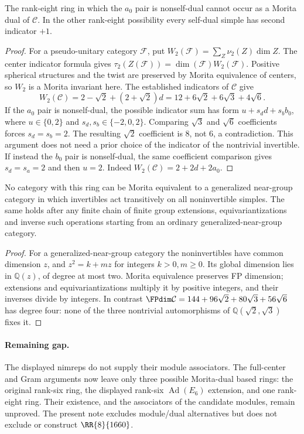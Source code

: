 \begin{corollary}
The rank-eight ring in which the $a_0$ pair is nonself-dual cannot occur
as a Morita dual of $\mathcal C$. In the other rank-eight possibility every
self-dual simple has second indicator $+1$.
\end{corollary}
\begin{proof}
For a pseudo-unitary category $\mathcal F$, put
$W_2(\mathcal F)=\sum_Z\nu_2(Z)\dim Z$.
The center indicator formula gives
$\tau_2(Z(\mathcal F))=\dim(\mathcal F)W_2(\mathcal F)$.
Positive spherical structures and the twist are preserved by Morita
equivalence of centers, so $W_2$ is a Morita invariant here. The
established indicators of $\mathcal C$ give
\[
W_2(\mathcal C)=2-\sqrt2+(2+\sqrt2)d
       =12+6\sqrt2+6\sqrt3+4\sqrt6.
\]
If the $a_0$ pair is nonself-dual, the possible indicator sum has form
$u+s_d d+s_b b_0$, where $u\in\{0,2\}$ and
$s_d,s_b\in\{-2,0,2\}$. Comparing $\sqrt3$ and $\sqrt6$
coefficients forces $s_d=s_b=2$. The resulting $\sqrt2$ coefficient
is $8$, not $6$, a contradiction. This argument does not need a prior
choice of the indicator of the nontrivial invertible.
If instead the $b_0$ pair is nonself-dual, the same coefficient
comparison gives $s_d=s_a=2$ and then $u=2$.
Indeed $W_2(\mathcal C)=2+2d+2a_0$.
\end{proof}

\begin{corollary}
No category with this ring can be Morita equivalent to a generalized
near-group category in which invertibles act transitively on all
noninvertible simples. The same holds after any finite chain of finite
group extensions, equivariantizations and inverse such operations
starting from an ordinary generalized-near-group category.
\end{corollary}
\begin{proof}
For a generalized-near-group category the noninvertibles have common
dimension $z$, and $z^2=k+mz$ for integers $k>0,m\geq0$. Its global
dimension lies in $\mathbb Q(z)$, of degree at most two. Morita
equivalence preserves FP dimension; extensions and equivariantizations
multiply it by positive integers, and their inverses divide by integers.
In contrast $\FPdim\mathcal C=144+96\sqrt2+80\sqrt3+56\sqrt6$ has degree four:
none of the three nontrivial automorphisms of
$\mathbb Q(\sqrt2,\sqrt3)$ fixes it.
\end{proof}

\paragraph{Remaining gap.}
The displayed nimreps do not supply their module associators.
The full-center and Gram arguments now leave only three possible
Morita-dual based rings: the original rank-six ring, the displayed
rank-six $\operatorname{Ad}(E_6)$ extension, and one rank-eight ring.
Their existence, and the associators of the candidate modules, remain
unproved. The present note excludes module/dual alternatives but does
not exclude or construct $\RR{8}{1660}$.

